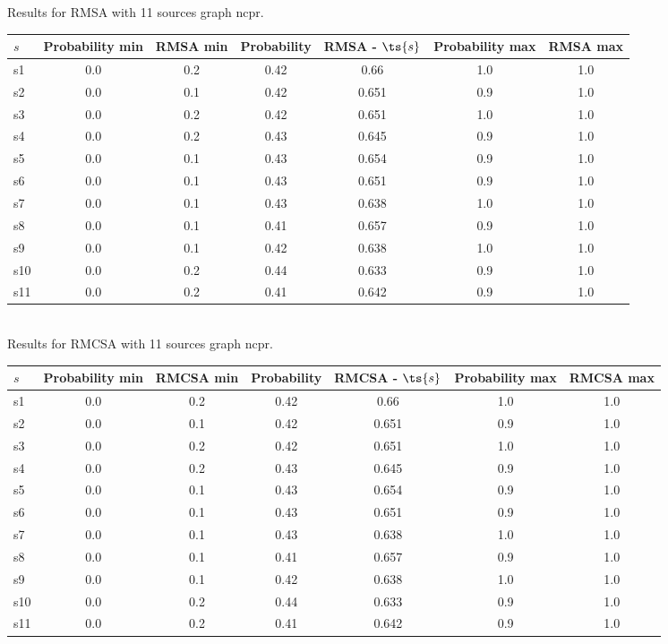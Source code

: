 \documentclass{article}
\begin{document}
\noindent Results for RMSA with 11 sources graph ncpr.

\noindent\begin{tabular}{|l|c|c|c|c|c|c|}
\hline
$s$& Probability min & RMSA min & Probability & RMSA - $\ts{s}$ & Probability max & RMSA max\\
\hline
s1 &0.0 & 0.2 & 0.42 & 0.66 & 1.0 & 1.0\\
\hline
s2 &0.0 & 0.1 & 0.42 & 0.651 & 0.9 & 1.0\\
\hline
s3 &0.0 & 0.2 & 0.42 & 0.651 & 1.0 & 1.0\\
\hline
s4 &0.0 & 0.2 & 0.43 & 0.645 & 0.9 & 1.0\\
\hline
s5 &0.0 & 0.1 & 0.43 & 0.654 & 0.9 & 1.0\\
\hline
s6 &0.0 & 0.1 & 0.43 & 0.651 & 0.9 & 1.0\\
\hline
s7 &0.0 & 0.1 & 0.43 & 0.638 & 1.0 & 1.0\\
\hline
s8 &0.0 & 0.1 & 0.41 & 0.657 & 0.9 & 1.0\\
\hline
s9 &0.0 & 0.1 & 0.42 & 0.638 & 1.0 & 1.0\\
\hline
s10 &0.0 & 0.2 & 0.44 & 0.633 & 0.9 & 1.0\\
\hline
s11 &0.0 & 0.2 & 0.41 & 0.642 & 0.9 & 1.0\\
\hline
\end{tabular}\\

\noindent Results for RMCSA with 11 sources graph ncpr.

\noindent\begin{tabular}{|l|c|c|c|c|c|c|}
\hline
$s$& Probability min & RMCSA min & Probability & RMCSA - $\ts{s}$ & Probability max & RMCSA max\\
\hline
s1 &0.0 & 0.2 & 0.42 & 0.66 & 1.0 & 1.0\\
\hline
s2 &0.0 & 0.1 & 0.42 & 0.651 & 0.9 & 1.0\\
\hline
s3 &0.0 & 0.2 & 0.42 & 0.651 & 1.0 & 1.0\\
\hline
s4 &0.0 & 0.2 & 0.43 & 0.645 & 0.9 & 1.0\\
\hline
s5 &0.0 & 0.1 & 0.43 & 0.654 & 0.9 & 1.0\\
\hline
s6 &0.0 & 0.1 & 0.43 & 0.651 & 0.9 & 1.0\\
\hline
s7 &0.0 & 0.1 & 0.43 & 0.638 & 1.0 & 1.0\\
\hline
s8 &0.0 & 0.1 & 0.41 & 0.657 & 0.9 & 1.0\\
\hline
s9 &0.0 & 0.1 & 0.42 & 0.638 & 1.0 & 1.0\\
\hline
s10 &0.0 & 0.2 & 0.44 & 0.633 & 0.9 & 1.0\\
\hline
s11 &0.0 & 0.2 & 0.41 & 0.642 & 0.9 & 1.0\\
\hline
\end{tabular}\\
\end{document}
